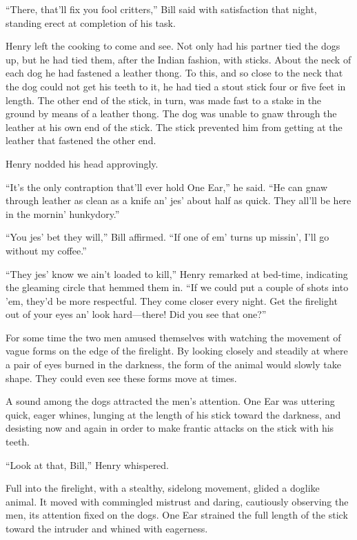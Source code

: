 “There, that’ll fix you fool critters,” Bill said with satisfaction
that night, standing erect at completion of his task.

Henry left the cooking to come and see. Not only had his partner tied
the dogs up, but he had tied them, after the Indian fashion, with
sticks. About the neck of each dog he had fastened a leather thong. To
this, and so close to the neck that the dog could not get his teeth to
it, he had tied a stout stick four or five feet in length. The other
end of the stick, in turn, was made fast to a stake in the ground by
means of a leather thong. The dog was unable to gnaw through the
leather at his own end of the stick. The stick prevented him from
getting at the leather that fastened the other end.

Henry nodded his head approvingly.

“It’s the only contraption that’ll ever hold One Ear,” he said. “He can
gnaw through leather as clean as a knife an’ jes’ about half as quick.
They all’ll be here in the mornin’ hunkydory.”

“You jes’ bet they will,” Bill affirmed. “If one of em’ turns up
missin’, I’ll go without my coffee.”

“They jes’ know we ain’t loaded to kill,” Henry remarked at bed-time,
indicating the gleaming circle that hemmed them in. “If we could put a
couple of shots into ’em, they’d be more respectful. They come closer
every night. Get the firelight out of your eyes an’ look hard—there!
Did you see that one?”

For some time the two men amused themselves with watching the movement
of vague forms on the edge of the firelight. By looking closely and
steadily at where a pair of eyes burned in the darkness, the form of
the animal would slowly take shape. They could even see these forms
move at times.

A sound among the dogs attracted the men’s attention. One Ear was
uttering quick, eager whines, lunging at the length of his stick toward
the darkness, and desisting now and again in order to make frantic
attacks on the stick with his teeth.

“Look at that, Bill,” Henry whispered.

Full into the firelight, with a stealthy, sidelong movement, glided a
doglike animal. It moved with commingled mistrust and daring,
cautiously observing the men, its attention fixed on the dogs. One Ear
strained the full length of the stick toward the intruder and whined
with eagerness.

